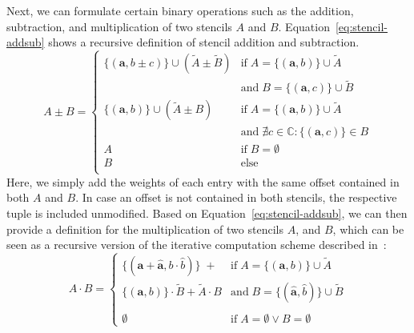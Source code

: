Next, we can formulate certain binary operations such as the addition, subtraction, and multiplication of two stencils $A$ and $B$.
Equation~\eqref{eq:stencil-addsub} shows a recursive definition of stencil addition and subtraction.
\begin{equation}
	A \pm B = 
	\begin{cases}
		\{(\bm{a}, b\pm c ) \} \cup (\tilde{A} \pm \tilde{B}) & \text{if} \; A = 	\{(\bm{a}, b ) \} \cup \tilde{A} \\
		& \text{and} \; B = \{(\bm{a}, c ) \} \cup \tilde{B} \\
		
		\{(\bm{a}, b ) \} \cup (\tilde{A} \pm B) & \text{if} \; A = 	\{(\bm{a}, b ) \} \cup \tilde{A} \\
		& \text{and} \; \nexists  c \in \mathbb{C} : \{(\bm{a}, c ) \} \in B 
		\\
		A & \text{if} \; B = \emptyset
		\\
		B & \text{else} 
		\\
	\end{cases}
\label{eq:stencil-addsub}
\end{equation}
Here, we simply add the weights of each entry with the same offset contained in both $A$ and $B$.
In case an offset is not contained in both stencils, the respective tuple is included unmodified.  
Based on Equation~\eqref{eq:stencil-addsub}, we can then provide a definition for the multiplication of two stencils $A$, and $B$, which can be seen as a recursive version of the iterative computation scheme described in~\cite{rittich2018extending}:
\begin{equation}
	A \cdot B = 
	\begin{cases}
		\{(\bm{a} + \bm{\hat{a}}, b \cdot \hat{b} ) \} \; + & \text{if} \; A = \{(\bm{a}, b ) \} \cup \tilde{A} \\
		\{(\bm{a}, b ) \} \cdot \tilde{B} + \tilde{A} \cdot B & 
		\text{and} \; B = \{(\bm{\hat{a}}, \hat{b} ) \} \cup \tilde{B} \\ & \\
		\emptyset & \text{if} \; A = \emptyset \vee B = \emptyset
	\end{cases}
\label{eq:stencil-mult}
\end{equation}

